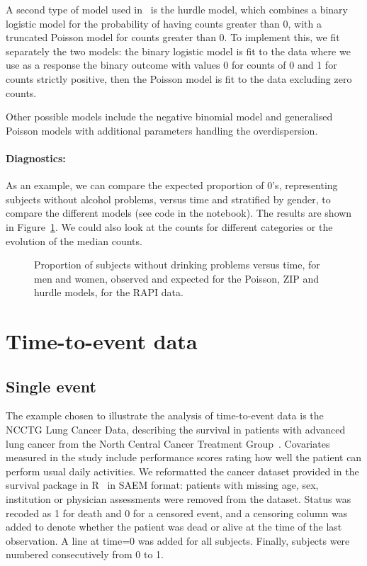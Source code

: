 A second type of model used in~\cite{Atkins13} is the hurdle model, which combines a binary logistic model for the probability of having counts greater than 0, with a truncated Poisson model for counts greater than 0. To implement this, we fit separately the two models: the binary logistic model is fit to the data where we use as a response the binary outcome with values 0 for counts of 0 and 1 for counts strictly positive, then the Poisson model is fit to the data excluding zero counts.

Other possible models include the negative binomial model and generalised Poisson models with additional parameters handling the overdispersion.

\par \kern -0.5cm
\paragraph{Diagnostics:} As an example, we can compare the expected proportion of 0's, representing subjects without alcohol problems, versus time and stratified by gender, to compare the different models (see code in the notebook). The results are shown in Figure~\ref{fig:rapiCompareProp0}. We could also look at the counts for different categories or the evolution of the median counts. 


\begin{figure}[!h]
\begin{center}
\end{center}
\par \kern -0.5cm
\caption{Proportion of subjects without drinking problems versus time, for men and women, observed and expected for the Poisson, ZIP and hurdle models, for the RAPI data.} \label{fig:rapiCompareProp0}
\end{figure}


\clearpage
\newpage

\section{Time-to-event data}

\subsection{Single event} \label{sec:lungtte}

The example chosen to illustrate the analysis of time-to-event data is the NCCTG Lung Cancer Data, describing the survival in patients with advanced lung cancer from the North Central Cancer Treatment Group~\cite{Loprinzi94}. Covariates measured in the study include performance scores rating how well the patient can perform usual daily activities. We reformatted the {\sf cancer} dataset provided in the {\sf survival} package in R~\cite{survivalPkg} in SAEM format: patients with missing age, sex, institution or physician assessments were removed from the dataset. Status was recoded as 1 for death and 0 for a censored event, and a censoring column was added to denote whether the patient was dead or alive at the time of the last observation. A line at time=0 was added for all subjects. Finally, subjects were numbered consecutively from 0 to 1.

